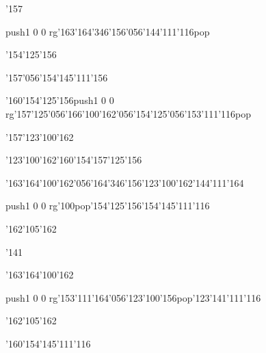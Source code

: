 \null\vfill\ipa\centerline{\enskip\enskip\enskip\enskip\enskip\enskip\enskip\char'157\enskip\enskip\enskip\enskip\enskip}\medskip\centerline{\enskip\pdfcolorstack\match push{1 0 0 rg}\char'163\char'164\char'346\char'156\char'056\char'144\char'111\char'116\pdfcolorstack\match pop{}\enskip\enskip\enskip\enskip\enskip\enskip\enskip\enskip\enskip\enskip\enskip}\medskip\centerline{\enskip\enskip\enskip\char'154\char'125\char'156\enskip\enskip\enskip\enskip\enskip\enskip\enskip\enskip\enskip\enskip\enskip\enskip}\medskip\centerline{\enskip\enskip\enskip\enskip\enskip\enskip\enskip\enskip\enskip\enskip\enskip\enskip\enskip\enskip}\medskip\centerline{\enskip\enskip\enskip\enskip\enskip\enskip\enskip\enskip\enskip\enskip\enskip\enskip\enskip\enskip}\medskip\vfill\footline{\hfil\tt\folio\hfil}\eject
\null\vfill\ipa\centerline{\enskip\enskip\enskip\enskip\enskip\enskip\enskip\char'157\char'056\char'154\char'145\char'111\char'156}\medskip\centerline{\enskip\char'160\char'154\char'125\char'156\enskip\enskip\enskip\enskip\enskip\pdfcolorstack\match push{1 0 0 rg}\char'157\char'125\char'056\char'166\char'100\char'162\char'056\char'154\char'125\char'056\char'153\char'111\char'116\pdfcolorstack\match pop{}}\medskip\centerline{\enskip\char'157\enskip\enskip\enskip\enskip\char'123\char'100\char'162\enskip\enskip\enskip\enskip\enskip\enskip\enskip\enskip}\medskip\centerline{\enskip\enskip\enskip\enskip\enskip\enskip\enskip\enskip\enskip\enskip\enskip\enskip\enskip\enskip}\medskip\centerline{\enskip\enskip\enskip\char'123\char'100\char'162\enskip\enskip\enskip\enskip\char'160\char'154\char'157\char'125\char'156}\medskip\vfill\footline{\hfil\tt\folio\hfil}\eject
\null\vfill\ipa\centerline{\enskip\enskip\enskip\enskip\enskip\enskip\enskip\enskip\enskip\enskip\enskip\enskip}\medskip\centerline{\enskip\char'163\char'164\char'100\char'162\char'056\char'164\char'346\char'156\enskip\enskip\enskip\char'123\char'100\char'162\enskip\enskip\enskip\char'144\char'111\char'164}\medskip\centerline{\enskip\pdfcolorstack\match push{1 0 0 rg}\char'100\pdfcolorstack\match pop{}\enskip\char'154\char'125\char'156\enskip\enskip\enskip\enskip\enskip\char'154\char'145\char'111\char'116\enskip\enskip\enskip\enskip}\medskip\centerline{\enskip\char'162\char'105\char'162\enskip\enskip\enskip\enskip\enskip\enskip\enskip\enskip\enskip\enskip\enskip}\medskip\centerline{\enskip\enskip\enskip\enskip\enskip\enskip\enskip\enskip\enskip\enskip\enskip\enskip\enskip\enskip}\medskip\vfill\footline{\hfil\tt\folio\hfil}\eject
\null\vfill\ipa\centerline{\enskip\enskip\enskip\enskip\enskip\enskip\enskip\char'141\enskip\enskip\enskip\enskip\enskip}\medskip\centerline{\enskip\char'163\char'164\char'100\char'162\enskip\enskip\enskip\enskip\enskip\enskip\enskip\enskip\enskip\enskip\enskip\enskip\enskip\enskip\enskip}\medskip\centerline{\enskip\enskip\enskip\pdfcolorstack\match push{1 0 0 rg}\char'153\char'111\char'164\char'056\char'123\char'100\char'156\pdfcolorstack\match pop{}\enskip\char'123\char'141\char'111\char'116\enskip\enskip\enskip\enskip}\medskip\centerline{\enskip\char'162\char'105\char'162\enskip\enskip\enskip\enskip\enskip\enskip\enskip\enskip\enskip\enskip\enskip}\medskip\centerline{\enskip\enskip\enskip\enskip\enskip\enskip\enskip\enskip\enskip\char'160\char'154\char'145\char'111\char'116}\medskip\vfill\footline{\hfil\tt\folio\hfil}\eject
